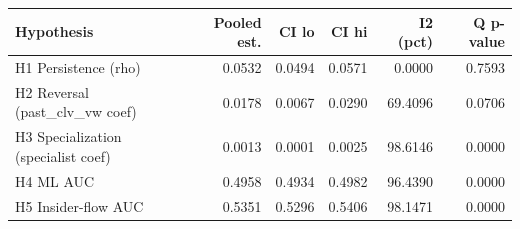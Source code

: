 \begin{tabular}{lrrrrr}
\toprule
Hypothesis & Pooled est. & CI lo & CI hi & I2 (pct) & Q p-value \\
\midrule
H1 Persistence (rho) & 0.0532 & 0.0494 & 0.0571 & 0.0000 & 0.7593 \\
H2 Reversal (past\_clv\_vw coef) & 0.0178 & 0.0067 & 0.0290 & 69.4096 & 0.0706 \\
H3 Specialization (specialist coef) & 0.0013 & 0.0001 & 0.0025 & 98.6146 & 0.0000 \\
H4 ML AUC & 0.4958 & 0.4934 & 0.4982 & 96.4390 & 0.0000 \\
H5 Insider-flow AUC & 0.5351 & 0.5296 & 0.5406 & 98.1471 & 0.0000 \\
\bottomrule
\end{tabular}
